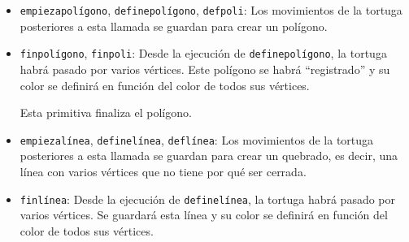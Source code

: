\begin{itemize}
   \item \texttt{empiezapol\'igono}, \texttt{definepol\'igono}, \texttt{defpoli}:%
      Los movimientos de la tortuga posteriores a esta llamada se guardan para
      crear un pol\'igono.
   \item \texttt{finpol\'igono}, \texttt{finpoli}:%
      Desde la ejecuci\'on de \texttt{definepol\'igono}, la tortuga habr\'a
      pasado por varios v\'ertices. Este pol\'igono se habr\'a ``registrado'' y
      su color se definir\'a en funci\'on del color de todos sus v\'ertices.

      Esta primitiva finaliza el pol\'igono.
   \item \texttt{empiezal\'inea}, \texttt{definel\'inea}, \texttt{defl\'inea}:%
      Los movimientos de la tortuga posteriores a esta llamada se guardan para
      crear un quebrado, es decir, una l\'inea con varios v\'ertices que no tiene
      por qu\'e ser cerrada.
   \item \texttt{finl\'inea}:
      Desde la ejecuci\'on de \texttt{definel\'inea}, la tortuga habr\'a
      pasado por varios v\'ertices. Se guardar\'a esta l\'inea y su color se
      definir\'a en funci\'on del color de todos sus v\'ertices.


\end{itemize}
